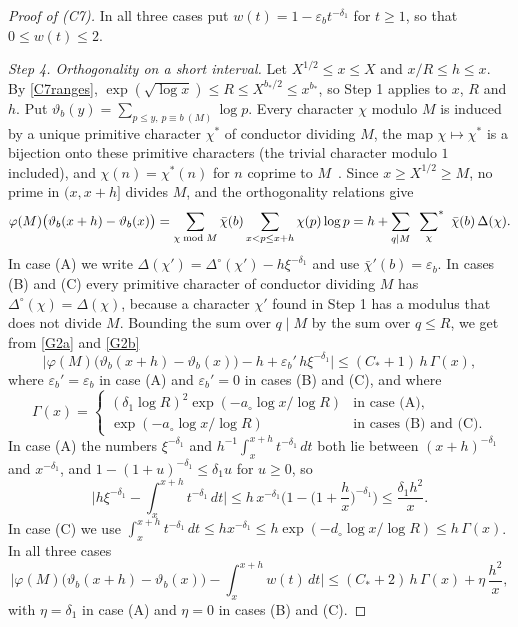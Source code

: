 \begin{proof}[Proof of (C7)]
In all three cases put $w(t)=1-\varepsilon_bt^{-\delta_1}$ for $t\ge1$, so that $0\le w(t)\le2$.

\emph{Step 4. Orthogonality on a short interval.} Let $X^{1/2}\le x\le X$ and $x/R\le h\le x$. By \eqref{C7ranges}, $\exp(\sqrt{\log x})\le R\le X^{b_\ast/2}\le x^{b_\ast}$, so Step 1 applies to $x$, $R$ and $h$. Put $\vartheta_b(y)=\sum_{p\le y,\,p\equiv b\ (M)}\log p$. Every character $\chi$ modulo $M$ is induced by a unique primitive character $\chi^\ast$ of conductor dividing $M$, the map $\chi\mapsto\chi^\ast$ is a bijection onto these primitive characters (the trivial character modulo $1$ included), and $\chi(n)=\chi^\ast(n)$ for $n$ coprime to $M$~\cite[Ch.~5]{davenport}. Since $x\ge X^{1/2}\ge M$, no prime in $(x,x+h]$ divides $M$, and the orthogonality relations give
\[
\varphi(M)\big(\vartheta_b(x+h)-\vartheta_b(x)\big)=\sum_{\chi\bmod M}\bar\chi(b)\sum_{x<p\le x+h}\chi(p)\log p=h+\sum_{q\mid M}\ \sideset{}{^\ast}\sum_{\chi}\ \bar\chi(b)\,\Delta(\chi).
\]
In case (A) we write $\Delta(\chi')=\Delta^\circ(\chi')-h\xi^{-\delta_1}$ and use $\bar\chi'(b)=\varepsilon_b$. In cases (B) and (C) every primitive character of conductor dividing $M$ has $\Delta^\circ(\chi)=\Delta(\chi)$, because a character $\chi'$ found in Step 1 has a modulus that does not divide $M$. Bounding the sum over $q\mid M$ by the sum over $q\le R$, we get from \eqref{G2a} and \eqref{G2b}
\[
\Big\lvert\varphi(M)\big(\vartheta_b(x+h)-\vartheta_b(x)\big)-h+\varepsilon_b'\,h\xi^{-\delta_1}\Big\rvert\le(C_\ast+1)\,h\,\Gamma(x),
\]
where $\varepsilon_b'=\varepsilon_b$ in case (A) and $\varepsilon_b'=0$ in cases (B) and (C), and where
\[
\Gamma(x)=\begin{cases}(\delta_1\log R)^2\exp(-a_\circ\log x/\log R)&\text{in case (A)},\\ \exp(-a_\circ\log x/\log R)&\text{in cases (B) and (C)}.\end{cases}
\]
In case (A) the numbers $\xi^{-\delta_1}$ and $h^{-1}\int_x^{x+h}t^{-\delta_1}\,dt$ both lie between $(x+h)^{-\delta_1}$ and $x^{-\delta_1}$, and $1-(1+u)^{-\delta_1}\le\delta_1u$ for $u\ge0$, so
\[
\Big\lvert h\xi^{-\delta_1}-\int_x^{x+h}t^{-\delta_1}\,dt\Big\rvert\le h\,x^{-\delta_1}\Big(1-\Big(1+\frac hx\Big)^{-\delta_1}\Big)\le\frac{\delta_1h^2}x .
\]
In case (C) we use $\int_x^{x+h}t^{-\delta_1}\,dt\le hx^{-\delta_1}\le h\exp(-d_\circ\log x/\log R)\le h\,\Gamma(x)$. In all three cases
\begin{equation}\label{C7block}
\Big\lvert\varphi(M)\big(\vartheta_b(x+h)-\vartheta_b(x)\big)-\int_x^{x+h}w(t)\,dt\Big\rvert\le(C_\ast+2)\,h\,\Gamma(x)+\eta\,\frac{h^2}x,
\end{equation}
with $\eta=\delta_1$ in case (A) and $\eta=0$ in cases (B) and (C).


\end{proof}
